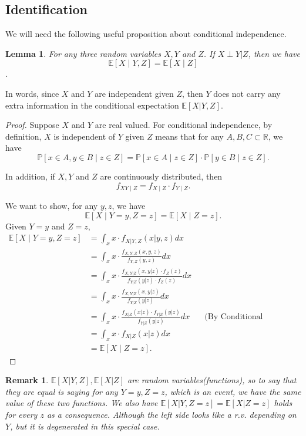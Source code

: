\documentclass[11pt,a4paper]{amsart}
\theoremstyle{plain}
\newtheorem{lemma}{Lemma}
\newtheorem*{remark*}{Remark}
\theoremstyle{definition}
\begin{document}
\subsection{Identification} \hfill\par 
	We will need the following useful proposition about conditional independence. 
	\begin{lemma}\label{observables, lemma for iden}
		For any three random variables $X,Y$ and $Z$. If $X \perp Y | Z$, then we have 
		\[	\mathbb{E}[X \mid Y,Z] = \mathbb{E}[X \mid Z]	\].
	\end{lemma}
	In words, since $X$ and $Y$ are independent given $Z$, then $Y$ does not carry any extra information in the conditional expectation $\mathbb{E}[X|Y,Z]$.
	\begin{proof}
		Suppose $X$ and $Y$ are real valued. 
		For conditional independence, by definition, $X$ is independent of $Y$ given $Z$ means that for any $A, B, C \subset \mathbb{R}$, we have 
		\[	\mathbb{P}[x \in A, y \in B \mid z \in Z] = \mathbb{P}[x \in A \mid z \in Z] \cdot \mathbb{P}[y \in B \mid z \in Z].	\]
		
		In addition, if $X, Y$ and $Z$ are continuously distributed, then
		\[	f_{XY \mid Z} = f_{X \mid Z} \cdot f_{Y \mid Z}.	\]
		
		We want to show, for any $y,z$, we have 
		\[	\mathbb{E}[X \mid Y=y, Z=z] = 	\mathbb{E}[X \mid Z=z].	\]
		Given $Y=y$ and $Z=z$,
		\[	\begin{aligned}
				\mathbb{E}[X \mid Y=y, Z=z] &= \int_{x} x \cdot f_{X|Y,Z}(x|y,z) dx \\
				&=  \int_{x} x \cdot \frac{f_{X,Y,Z}(x,y,z)}{f_{Y,Z}(y,z)} dx \\
				&= \int_{x} x \cdot \frac{f_{X,Y|Z}(x,y|z)\cdot f_{Z}(z)}{f_{Y|Z}(y|z)\cdot f_{Z}(z)} dx \\
				&= \int_{x} x \cdot \frac{f_{X,Y|Z}(x,y|z)}{f_{Y|Z}(y|z)} dx \\
				&=  \int_{x} x \cdot \frac{f_{X|Z}(x|z)\cdot f_{Y|Z}(y|z)}{f_{Y|Z}(y|z)} dx &&\text{(By Conditional Independence Asum.)} \\
				&= \int_{x} x \cdot f_{X|Z}(x|z) dx	\\
				&= \mathbb{E}[X \mid Z=z].
		\end{aligned}	\]
	\end{proof}

	\begin{remark*}
		$\mathbb{E}[X|Y,Z] , \mathbb{E}[X|Z]$ are random variables(functions), so to say that they are equal is saying for any $Y=y, Z=z$, which is an event, we have the same value of these two functions. We also have $\mathbb{E}[X|Y, Z=z] =  \mathbb{E}[X|Z=z]$ holds for every $z$ as a consequence. Although the left side looks like a r.v. depending on $Y$, but it is degenerated in this special case.
	\end{remark*}
	
\end{document}
